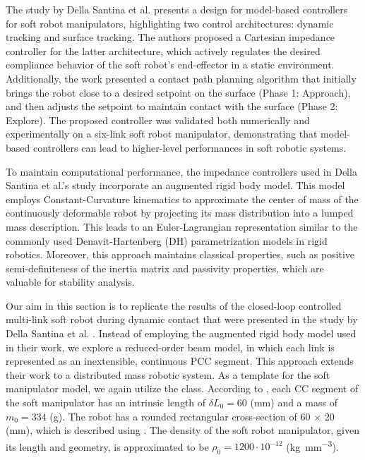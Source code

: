 The study by Della Santina et al. \cite{DellaSantina2019Nov} presents a design for model-based controllers for soft robot manipulators, highlighting two control architectures: dynamic tracking and surface tracking. The authors proposed a Cartesian impedance controller for the latter architecture, which actively regulates the desired compliance behavior of the soft robot's end-effector in a static environment. Additionally, the work presented a contact path planning algorithm that initially brings the robot close to a desired setpoint on the surface (Phase 1: Approach), and then adjusts the setpoint to maintain contact with the surface (Phase 2: Explore). The proposed controller was validated both numerically and experimentally on a six-link soft robot manipulator, demonstrating that model-based controllers can lead to higher-level performances in soft robotic systems.

To maintain computational performance, the impedance controllers used in Della Santina et al.'s study \cite{DellaSantina2019Nov} incorporate an augmented rigid body model. This model employs Constant-Curvature kinematics to approximate the center of mass of the continuously deformable robot by projecting its mass distribution into a lumped mass description. This leads to an Euler-Lagrangian representation similar to the commonly used Denavit-Hartenberg (DH) parametrization models in rigid robotics. Moreover, this approach maintains classical properties, such as positive semi-definiteness of the inertia matrix and passivity properties, which are valuable for stability analysis.

Our aim in this section is to replicate the results of the closed-loop controlled multi-link soft robot during dynamic contact that were presented in the study by Della Santina et al. \cite{DellaSantina2019Nov}. Instead of employing the augmented rigid body model used in their work, we explore a reduced-order beam model, in which each link is represented as an inextensible, continuous PCC segment. This approach extends their work to a distributed mass robotic system. As a template for the soft manipulator model, we again utilize the  class. According to \cite{DellaSantina2019Nov}, each CC segment of the soft manipulator has an intrinsic length of $\delta L_0 = 60$ (mm) and a mass of $m_0 = 334$ (g). The robot has a rounded rectangular cross-section of 60 $\times$ 20 (mm), which is described using . The density of the soft robot manipulator, given its length and geometry, is approximated to be $\rho_0 = 1200 \cdot 10^{-12}$ (\si{\kilo \gram \per \milli \metre \cubed}). 


